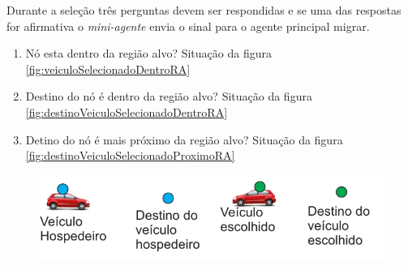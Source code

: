 Durante a seleção três perguntas devem ser respondidas e se uma das respostas for afirmativa o \emph{mini-agente} envia o sinal para o agente principal migrar.

\begin{enumerate}
 \item Nó esta dentro da região alvo? Situação da figura \ref{fig:veiculoSelecionadoDentroRA}
 \item Destino do nó é dentro da região alvo? Situação da figura \ref{fig:destinoVeiculoSelecionadoDentroRA}
 \item Detino do nó é mais próximo da região alvo? Situação da figura \ref{fig:destinoVeiculoSelecionadoProximoRA}
\end{enumerate}

\begin{figure}[htbp]
	\centering
	\includegraphics[scale=0.7]{metodologia/figuras/legendaSelecaoMelhorVeiculo.pdf}
\end{figure}

